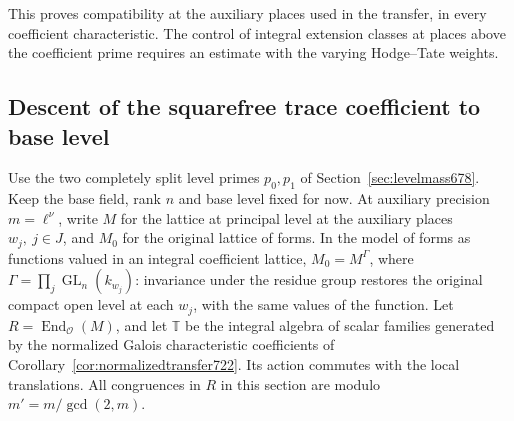 \documentclass[a4paper,11pt]{article}
\theoremstyle{definition}
\theoremstyle{remark}
\numberwithin{equation}{section}
\newcommand{\GL}{\operatorname{GL}}
\begin{document}
This proves compatibility at the auxiliary places used in the
transfer, in every coefficient characteristic. The control of
integral extension classes at places above the coefficient prime
requires an estimate with the varying Hodge--Tate weights.
\clearpage

\subsection{Descent of the squarefree trace coefficient to base level}
\label{sec:topdescent723}

Use the two completely split level primes \(p_0,p_1\) of
Section~\ref{sec:levelmass678}. Keep the base field, rank \(n\)
and base level fixed for now. At auxiliary precision
\(m=\ell^\nu\), write \(M\) for the lattice at principal
level at the auxiliary places \(w_j,\ j\in J\), and \(M_0\)
for the original lattice of forms. In the model of forms as
functions valued in an integral coefficient lattice,
\(M_0=M^\Gamma\), where
\(\Gamma=\prod_j\GL_n(k_{w_j})\): invariance under the
residue group restores the original compact open level at
each \(w_j\), with the same values of the function. Let
\(R=\operatorname{End}_{\mathcal O}(M)\), and let \(\mathbb T\)
be the integral algebra of scalar families generated by
the normalized Galois characteristic coefficients of
Corollary~\ref{cor:normalizedtransfer722}. Its action commutes
with the local translations. All congruences in \(R\) in this
section are modulo \(m'=m/\gcd(2,m)\).
\end{document}
